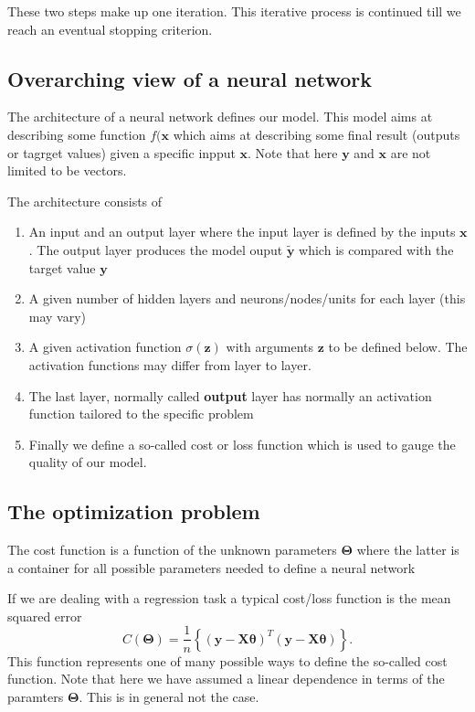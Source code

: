 \documentclass[%
oneside,                 %
final,                   %
10pt]{article}
\begin{document}
\noindent
These two steps make up one iteration. This iterative process is continued till we reach an eventual stopping criterion.

\subsection{Overarching view of a neural network}

The architecture of a neural network defines our model. This model
aims at describing some function $f(\bm{x}$ which aims at describing
some final result (outputs or tagrget values) given a specific inpput
$\bm{x}$. Note that here $\bm{y}$ and $\bm{x}$ are not limited to be
vectors.

The architecture consists of
\begin{enumerate}
\item An input and an output layer where the input layer is defined by the inputs $\bm{x}$. The output layer produces the model ouput $\bm{\tilde{y}}$ which is compared with the target value $\bm{y}$

\item A given number of hidden layers and neurons/nodes/units for each layer (this may vary)

\item A given activation function $\sigma(\bm{z})$ with arguments $\bm{z}$ to be defined below. The activation functions may differ from layer to layer.

\item The last layer, normally called \textbf{output} layer has normally an activation function tailored to the specific problem

\item Finally we define a so-called cost or loss function which is used to gauge the quality of our model. 
\end{enumerate}

\noindent
\subsection{The optimization problem}

The cost function is a function of the unknown parameters
$\bm{\Theta}$ where the latter is a container for all possible
parameters needed to define a neural network

If we are dealing with a regression task a typical cost/loss function
is the mean squared error
\[
C(\bm{\Theta})=\frac{1}{n}\left\{\left(\bm{y}-\bm{X}\bm{\theta}\right)^T\left(\bm{y}-\bm{X}\bm{\theta}\right)\right\}.
\]
This function represents one of many possible ways to define
the so-called cost function. Note that here we have assumed a linear dependence in terms of the paramters $\bm{\Theta}$. This is in general not the case.
\end{document}
